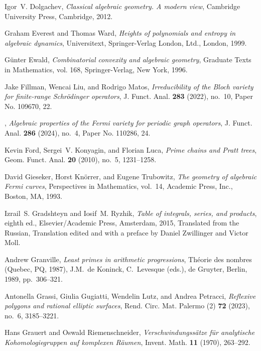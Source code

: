 \documentclass[12pt,reqno]{amsart}
\theoremstyle{definition}
\theoremstyle{plain}
\theoremstyle{definition}
\begin{document}
\begin{thebibliography}{100}
Igor~V. Dolgachev, \emph{Classical algebraic geometry. {A} modern view},
  Cambridge University Press, Cambridge, 2012.

Graham Everest and Thomas Ward, \emph{Heights of polynomials and entropy in
  algebraic dynamics}, Universitext, Springer-Verlag London, Ltd., London,
  1999.

G\"unter Ewald, \emph{Combinatorial convexity and algebraic geometry}, Graduate
  Texts in Mathematics, vol. 168, Springer-Verlag, New York, 1996.

Jake Fillman, Wencai Liu, and Rodrigo Matos, \emph{Irreducibility of the
  {B}loch variety for finite-range {S}chr\"odinger operators}, J. Funct. Anal.
  \textbf{283} (2022), no.~10, Paper No. 109670, 22.

\bysame, \emph{Algebraic properties of the {F}ermi variety for periodic graph
  operators}, J. Funct. Anal. \textbf{286} (2024), no.~4, Paper No. 110286, 24.

Kevin Ford, Sergei~V. Konyagin, and Florian Luca, \emph{Prime chains and
  {P}ratt trees}, Geom. Funct. Anal. \textbf{20} (2010), no.~5, 1231--1258.

David Gieseker, Horst Kn\"orrer, and Eugene Trubowitz, \emph{The geometry of
  algebraic {F}ermi curves}, Perspectives in Mathematics, vol.~14, Academic
  Press, Inc., Boston, MA, 1993.

Izrail~S. Gradshteyn and Iosif~M. Ryzhik, \emph{Table of integrals, series, and
  products}, eighth ed., Elsevier/Academic Press, Amsterdam, 2015, Translated
  from the Russian, Translation edited and with a preface by Daniel Zwillinger
  and Victor Moll.

Andrew Granville, \emph{Least primes in arithmetic progressions}, Th\'eorie des
  nombres ({Q}uebec, {PQ}, 1987), J.M.~de Koninck, C.~Levesque (eds.), de
  Gruyter, Berlin, 1989, pp.~306--321.

Antonella Grassi, Giulia Gugiatti, Wendelin Lutz, and Andrea Petracci,
  \emph{Reflexive polygons and rational elliptic surfaces}, Rend. Circ. Mat.
  Palermo (2) \textbf{72} (2023), no.~6, 3185--3221.

Hans Grauert and Oswald Riemenschneider, \emph{Verschwindungss{\"a}tze f{\"u}r
  analytische {Kohomologiegruppen} auf komplexen {R{\"a}umen}}, Invent. Math.
  \textbf{11} (1970), 263--292.


\end{thebibliography}
\end{document}
